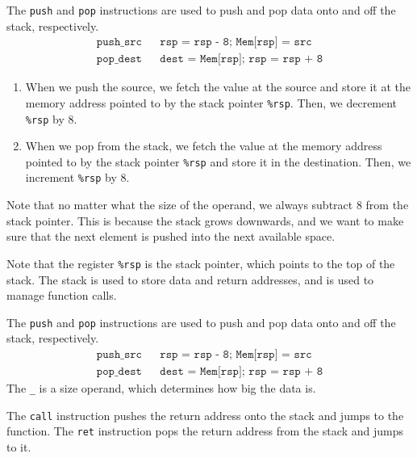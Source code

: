   \begin{definition}
    The \texttt{push} and \texttt{pop} instructions are used to push and pop data onto and off the stack, respectively. 
    \begin{align*}
      \texttt{push\_ src} && \texttt{rsp = rsp - 8; Mem[rsp] = src} \\
      \texttt{pop\_ dest} && \texttt{dest = Mem[rsp]; rsp = rsp + 8} 
    \end{align*}
    \begin{enumerate}
      \item When we push the source, we fetch the value at the source and store it at the memory address pointed to by the stack pointer \texttt{\%rsp}. Then, we decrement \texttt{\%rsp} by 8.
      \item When we pop from the stack, we fetch the value at the memory address pointed to by the stack pointer \texttt{\%rsp} and store it in the destination. Then, we increment \texttt{\%rsp} by 8.
    \end{enumerate}
    Note that no matter what the size of the operand, we always subtract 8 from the stack pointer. This is because the stack grows downwards, and we want to make sure that the next element is pushed into the next available space.
  \end{definition}

  Note that the register \texttt{\%rsp} is the stack pointer, which points to the top of the stack. The stack is used to store data and return addresses, and is used to manage function calls. 

  \begin{definition}
    The \texttt{push} and \texttt{pop} instructions are used to push and pop data onto and off the stack, respectively. 
    \begin{align*}
      \texttt{push\_ src} && \texttt{rsp = rsp - 8; Mem[rsp] = src} \\
      \texttt{pop\_ dest} && \texttt{dest = Mem[rsp]; rsp = rsp + 8} 
    \end{align*}
    The \texttt{\_} is a size operand, which determines how big the data is.
  \end{definition}

  \begin{definition}
    The \texttt{call} instruction pushes the return address onto the stack and jumps to the function. The \texttt{ret} instruction pops the return address from the stack and jumps to it.
  \end{definition}

